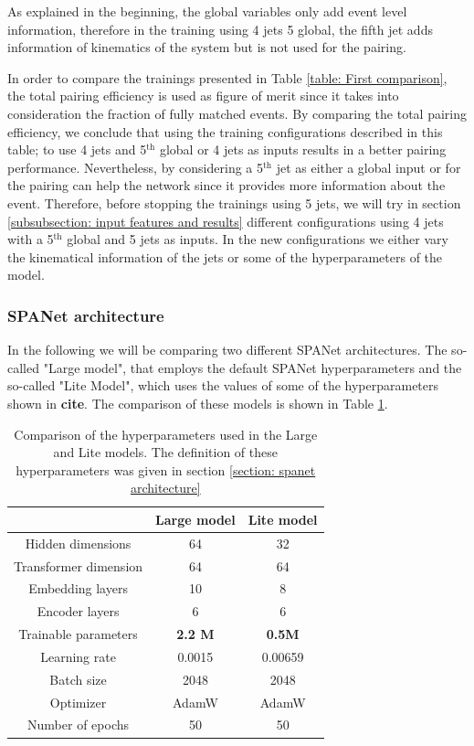 As explained in the beginning, the global variables only add event level information, therefore in the training using 4 jets 5 global, the fifth jet adds information of kinematics of the system but is not used for the pairing.

In order to compare the trainings presented in Table \ref{table: First comparison}, the total pairing efficiency is used as figure of merit since it takes into consideration the fraction of fully matched events.
By comparing the total pairing efficiency, we conclude that using the training configurations described in this table; to use 4 jets and 5$^{\text{th}}$ global or 4 jets as inputs results in a better pairing performance. Nevertheless, by considering a 5$^{\text{th}}$ jet as either a global input or for the pairing can help the network since it provides more information about the event. Therefore, before stopping the trainings using 5 jets, we will try in section \ref{subsubsection: input features and results} different configurations using 4 jets with a 5$^{\text{th}}$ global and 5 jets as inputs. In the new configurations we either vary the kinematical information of the jets or some of the hyperparameters of the model. 

\subsubsection{SPANet architecture} \label{large vs lite model}
In the following we will be comparing two different SPANet architectures. The so-called "Large model", that employs the default SPANet hyperparameters and the so-called "Lite Model", which uses the values of some of the hyperparameters shown in \textbf{cite}. The comparison of these models is shown in Table \ref{table:comparison_models}.

\begin{table}[h!]
    \centering
     \begin{tabular}{|c||c|c|}
      \hline
         & Large model &  Lite model\\ 
      \hline
      Hidden dimensions & 64 &  32\\ 
      \hline
      Transformer dimension& 64 & 64 \\ 
      \hline
      Embedding layers & 10 & 8 \\ 
      \hline
      Encoder layers & 6 & 6 \\ 
      \hline
      Trainable parameters & \textbf{2.2 M} & \textbf{0.5M} \\ 
      \hline
      Learning rate & 0.0015 & 0.00659 \\ 
      \hline
      Batch size & 2048 & 2048 \\ 
      \hline
      Optimizer & AdamW & AdamW \\ 
      \hline
      Number of epochs & 50 & 50 \\
      \hline
    \end{tabular}
    \caption{Comparison of the hyperparameters used in the Large and Lite models. The definition of these hyperparameters was given in section \ref{section: spanet architecture} }
    \label{table:comparison_models}
\end{table}


